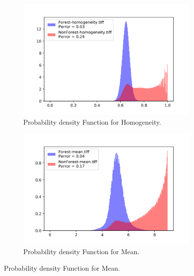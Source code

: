 \begin{figure}[H]\ContinuedFloat

  \centering
  \begin{subfigure}[b]{0.4\linewidth}
    \includegraphics[width=\linewidth]{Chapter4/sum_and_diff_textures/homogeneity_hist.png}
     \caption{Probability density Function for Homogeneity.}
  \end{subfigure}
  
  \centering
  \begin{subfigure}[b]{0.4\linewidth}
    \includegraphics[width=\linewidth]{Chapter4/sum_and_diff_textures/mean_hist.png}
     \caption{Probability density Function for Mean.}
  \end{subfigure}
  

\end{figure}

